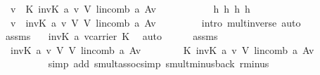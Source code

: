 \begin{isabellebody}
\ {}{\isacharcolon}\ {\isachardoublequoteopen}v\ {\isacharequal}\ {\isacharparenleft}{\isasymominus}\isactrlbsub K\isactrlesub \ {\isacharparenleft}inv\isactrlbsub K\isactrlesub \ {\isacharparenleft}a\ v{\isacharparenright}{\isacharparenright}{\isacharparenright}\ {\isasymodot}\isactrlbsub V\isactrlesub \ lincomb\ a\ {\isacharparenleft}A{\isacharminus}{\isacharbraceleft}v{\isacharbraceright}{\isacharparenright}{\isachardoublequoteclose}\isanewline
\ \ \isamarkupfalse%
\ {\isacharminus}\ \isanewline
\ \ \ \ \isamarkupfalse%
\ h{}\ h{}\ h{}\ h{}\ {}\ \isamarkupfalse%
\ {}{\isacharcolon}\ {\isachardoublequoteopen}v\ {\isacharequal}\ inv\isactrlbsub K\isactrlesub \ {\isacharparenleft}a\ v{\isacharparenright}\ {\isasymodot}\isactrlbsub V\isactrlesub \ {\isacharparenleft}{\isasymominus}\isactrlbsub V\isactrlesub \ lincomb\ a\ {\isacharparenleft}A{\isacharminus}{\isacharbraceleft}v{\isacharbraceright}{\isacharparenright}{\isacharparenright}{\isachardoublequoteclose}\ \isanewline
\ \ \ \ \ \ \isamarkupfalse%
\ {\isacharparenleft}intro\ mult{\isacharunderscore}inverse{\isacharcomma}\ auto{\isacharparenright}\isanewline
\ \ \ \ \isamarkupfalse%
\ assms\ \isamarkupfalse%
\ {}{\isacharcolon}\ {\isachardoublequoteopen}inv\isactrlbsub K\isactrlesub \ {\isacharparenleft}a\ v{\isacharparenright}{\isasymin}carrier\ K{\isachardoublequoteclose}\ \isamarkupfalse%
\ auto\isanewline
\ \ \ \ \isamarkupfalse%
\ assms\ {}\ {}\ \isamarkupfalse%
\ {}{\isacharcolon}\ {\isachardoublequoteopen}inv\isactrlbsub K\isactrlesub \ {\isacharparenleft}a\ v{\isacharparenright}\ {\isasymodot}\isactrlbsub V\isactrlesub \ {\isacharparenleft}{\isasymominus}\isactrlbsub V\isactrlesub \ lincomb\ a\ {\isacharparenleft}A{\isacharminus}{\isacharbraceleft}v{\isacharbraceright}{\isacharparenright}{\isacharparenright}\ \isanewline
\ \ \ \ \ \ {\isacharequal}\ {\isacharparenleft}{\isasymominus}\isactrlbsub K\isactrlesub \ {\isacharparenleft}inv\isactrlbsub K\isactrlesub \ {\isacharparenleft}a\ v{\isacharparenright}{\isacharparenright}{\isacharparenright}\ {\isasymodot}\isactrlbsub V\isactrlesub \ lincomb\ a\ {\isacharparenleft}A{\isacharminus}{\isacharbraceleft}v{\isacharbraceright}{\isacharparenright}{\isachardoublequoteclose}\isanewline
\ \ \ \ \ \ \ \ \isamarkupfalse%
\ {\isacharparenleft}simp\ add{\isacharcolon}\ smult{\isacharunderscore}assoc{\isacharunderscore}simp\ smult{\isacharunderscore}minus{\isacharunderscore}{}{\isacharunderscore}back\ r{\isacharunderscore}minus{\isacharparenright}\isanewline

\end{isabellebody}
